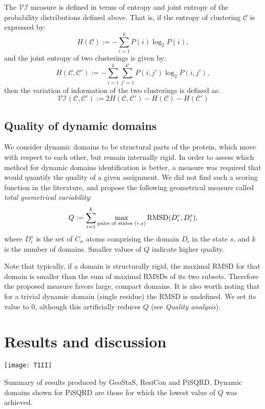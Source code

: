 The $\mathcal{VI}$ measure is defined in terms of entropy and joint entropy of the probability distributions defined above.
That is, if the entropy of clustering $\mathcal{C}$ is expressed by: $$H(\mathcal{C}) := -\sum_{i=1}^k P(i) \log_2 P(i),$$
and the joint entropy of two clusterings is given by: $$ H(\mathcal{C},\mathcal{C'}) := - \sum_{i=1}^k \sum_{j'=1}^{k'} P(i,j') \log_2 P(i,j'), $$
then the variation of information of the two clusterings is defined as: $$ \mathcal{VI}(\mathcal{C},\mathcal{C'}) := 2 H(\mathcal{C},\mathcal{C'}) - H(\mathcal{C}) - H(\mathcal{C'}) $$

\subsection*{Quality of dynamic domains}
We consider dynamic domains to be structural parts of the protein, which move with respect to each other, but remain internally rigid.
In order to assess which method for dynamic domains identification is better, a measure was required that would quantify the quality of a given assignment.
We did not find such a scoring function in the literature, and propose the following geometrical measure called \emph{total geometrical variability}:
$$
Q := \sum_{i=1}^k \max_{\text{pairs of states }\\(r,s)} \text{RMSD}(D^r_i,D^s_i),
$$
where $D^s_i$ is the set of $C_\alpha$ atoms comprising the domain $D_i$ in the state $s$, and $k$ is the number of domains.
Smaller values of $Q$ indicate higher quality.


Note that typically, if a domain is structurally rigid, the maximal RMSD for that domain is smaller than the sum of maximal $\text{RMSDs}$ of its two subsets.
Therefore the proposed measure favors large, compact domains.
It is also worth noting that for a trivial dynamic domain (single residue) the RMSD is undefined.
We set its value to 0, although this artificially reduces $Q$ (see \emph{Quality analysis}).


\section{Results and discussion}
\begin{table*}[b]
\centering
\texttt{[image: T1II]}
\caption{Summary of results produced by GeoStaS, ResiCon and PiSQRD.
Dynamic domains shown for PiSQRD are those for which the lowest value of $Q$ was achieved.}
\label{wholeTable}
\end{table*}

